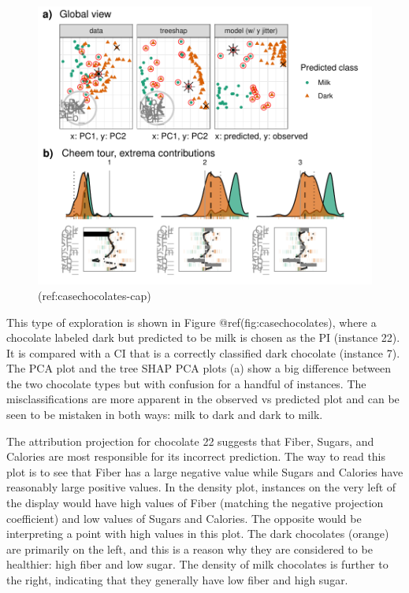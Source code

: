 \documentclass[
]{article}
\begin{document}
\begin{figure}

{\centering \includegraphics[width=1\linewidth]{./figures/case_chocolates} 

}

\caption{(ref:casechocolates-cap)}\label{fig:casechocolates}
\end{figure}

This type of exploration is shown in Figure @ref(fig:casechocolates),
where a chocolate labeled dark but predicted to be milk is chosen as the
PI (instance 22). It is compared with a CI that is a correctly
classified dark chocolate (instance 7). The PCA plot and the tree SHAP
PCA plots (a) show a big difference between the two chocolate types but
with confusion for a handful of instances. The misclassifications are
more apparent in the observed vs predicted plot and can be seen to be
mistaken in both ways: milk to dark and dark to milk.

The attribution projection for chocolate 22 suggests that Fiber, Sugars,
and Calories are most responsible for its incorrect prediction. The way
to read this plot is to see that Fiber has a large negative value while
Sugars and Calories have reasonably large positive values. In the
density plot, instances on the very left of the display would have high
values of Fiber (matching the negative projection coefficient) and low
values of Sugars and Calories. The opposite would be interpreting a
point with high values in this plot. The dark chocolates (orange) are
primarily on the left, and this is a reason why they are considered to
be healthier: high fiber and low sugar. The density of milk chocolates
is further to the right, indicating that they generally have low fiber
and high sugar.
\end{document}
